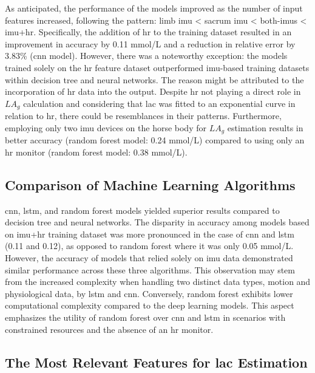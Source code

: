 As anticipated, the performance of the models improved as the number of input features increased, following the pattern: limb \gls{imu} < sacrum \gls{imu} < both-\gls{imu}s < \gls{imu}+\gls{hr}. Specifically, the addition of \gls{hr} to the training dataset resulted in an improvement in accuracy by 0.11 \gls{mmol/L} and a reduction in relative error by 3.83\% (\gls{cnn} model). However, there was a noteworthy exception: the models trained solely on the \gls{hr} feature dataset outperformed \gls{imu}-based training datasets within decision tree and neural networks. The reason might be attributed to the incorporation of \gls{hr} data into the output. Despite \gls{hr} not playing a direct role in $LA_g$ calculation and considering that \gls{lac} was fitted to an exponential curve in relation to \gls{hr}, there could be resemblances in their patterns. Furthermore, employing only two \gls{imu} devices on the horse body for $LA_g$ estimation results in better accuracy (random forest model: 0.24 \gls{mmol/L}) compared to using only an \gls{hr} monitor (random forest model: 0.38 \gls{mmol/L}).

\subsection{Comparison of Machine Learning Algorithms}

\gls{cnn}, \gls{lstm}, and random forest models yielded superior results compared to decision tree and neural networks. The disparity in accuracy among models based on \gls{imu}+\gls{hr} training dataset was more pronounced in the case of \gls{cnn} and \gls{lstm} (0.11 and 0.12), as opposed to random forest where it was only 0.05 \gls{mmol/L}. However, the accuracy of models that relied solely on \gls{imu} data demonstrated similar performance across these three algorithms. This observation may stem from the increased complexity when handling two distinct data types, motion and physiological data, by \gls{lstm} and \gls{cnn}. Conversely, random forest exhibits lower computational complexity compared to the deep learning models. This aspect emphasizes the utility of random forest over \gls{cnn} and \gls{lstm} in scenarios with constrained resources and the absence of an \gls{hr} monitor. 

\subsection{The Most Relevant Features for \gls{lac} Estimation}

